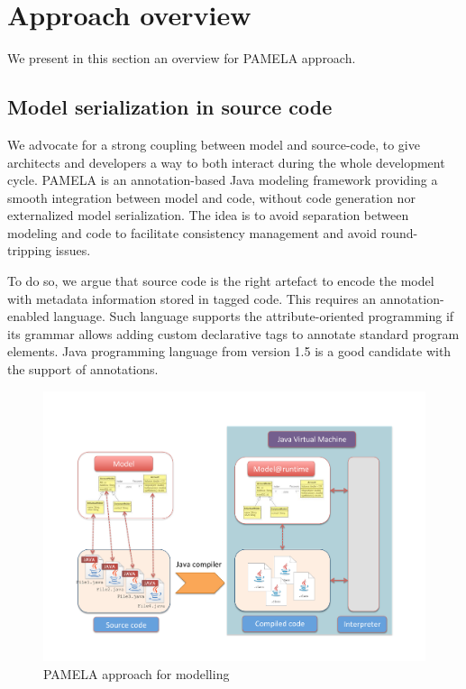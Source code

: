 \section{Approach overview}

We present in this section an overview for PAMELA approach.

\subsection{Model serialization in source code}

We advocate for a strong coupling between model and source-code, to give architects and developers a way to both interact during the whole development cycle. PAMELA is an annotation-based Java modeling framework providing a smooth integration between model and code, without code generation nor externalized model serialization. The idea is to avoid separation between modeling and code to facilitate consistency management and avoid round-tripping issues.

To do so, we argue that source code is the right artefact to encode the model with metadata information stored in tagged code. This requires an annotation-enabled language. Such language supports the attribute-oriented programming if its grammar allows adding custom declarative tags to annotate standard program elements. Java programming language from version 1.5 is a good candidate with the support of annotations.

\begin{figure}
    \centering
    \includegraphics[width=1.0 \columnwidth]{PamelaVision.pdf}
    \caption{PAMELA approach for modelling}
    \label{fig:PamelaVision}
\end{figure}

